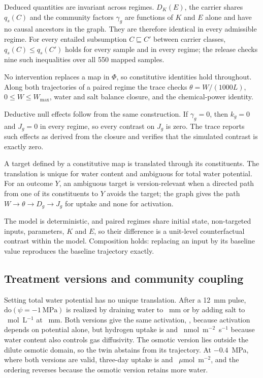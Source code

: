 \documentclass[11pt,a4paper]{article}
\begin{document}
Deduced quantities are invariant across regimes. $D_K(E)$, the carrier shares $q_s(C)$ and the community factors $\gamma_g$ are functions of $K$ and $E$ alone and have no causal ancestors in the graph. They are therefore identical in every admissible regime. For every entailed subsumption $C\sqsubseteq C'$ between carrier classes, $q_s(C)\leq q_s(C')$ holds for every sample and in every regime; the release checks nine such inequalities over all 550 mapped samples.

No intervention replaces a map in $\Phi$, so constitutive identities hold throughout. Along both trajectories of a paired regime the trace checks $\theta=W/(1000L)$, $0\leq W\leq W_{\max}$, water and salt balance closure, and the chemical-power identity.

Deductive null effects follow from the same construction. If $\gamma_g=0$, then $k_g=0$ and $J_g=0$ in every regime, so every contrast on $J_g$ is zero. The trace reports such effects as derived from the closure and verifies that the simulated contrast is exactly zero.

A target defined by a constitutive map is translated through its constituents. The translation is unique for water content and ambiguous for total water potential. For an outcome $Y$, an ambiguous target is version-relevant when a directed path from one of its constituents to $Y$ avoids the target; the graph gives the path $W\to\theta\to D_g\to J_g$ for uptake and none for activation.

The model is deterministic, and paired regimes share initial state, non-targeted inputs, parameters, $K$ and $E$, so their difference is a unit-level counterfactual contrast within the model. Composition holds: replacing an input by its baseline value reproduces the baseline trajectory exactly.

\subsection{Treatment versions and community coupling}
Setting total water potential has no unique translation. After a 12~mm pulse, $\mathrm{do}(\psi=-1~\mathrm{MPa})$ is realized by draining water to \PsiStrongMatricWater{}~mm or by adding salt to \PsiStrongOsmoticSalt{}~mol~L$^{-1}$ at \PsiStrongOsmoticWater{}~mm. Both versions give the same activation, \PsiStrongMatricA{}, because activation depends on potential alone, but hydrogen uptake is \PsiStrongMatricJHtwo{} and \PsiStrongOsmoticJHtwo{}~nmol~m$^{-2}$~s$^{-1}$ because water content also controls gas diffusivity. The osmotic version lies outside the dilute osmotic domain, so the twin abstains from its trajectory. At $-0.4$~MPa, where both versions are valid, three-day uptake is \PsiMildUptakeMatric{} and \PsiMildUptakeOsmotic{}~$\mu$mol~m$^{-2}$, and the ordering reverses because the osmotic version retains more water.
\end{document}
